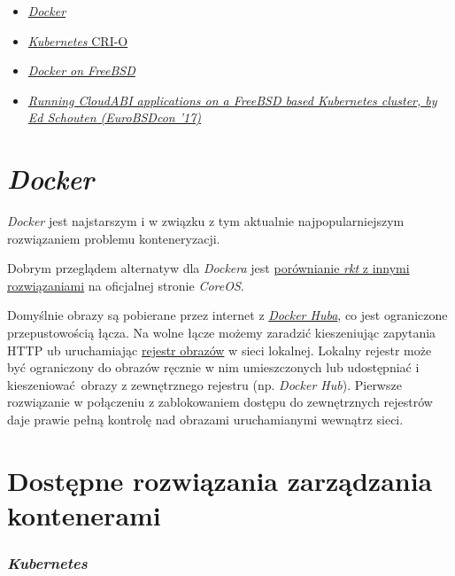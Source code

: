 \documentclass[a4paper,12pt,twoside,openany]{report}
\providecommand{\tightlist}{%
  \setlength{\itemsep}{0pt}\setlength{\parskip}{0pt}}
\begin{document}
\begin{itemize}
\tightlist
\item
  \href{https://blog.docker.com/2017/07/demystifying-open-container-initiative-oci-specifications/}{\emph{Docker}}
\item
  \href{https://github.com/kubernetes-incubator/cri-o}{\emph{Kubernetes}
  CRI-O}
\item
  \href{https://wiki.freebsd.org/Docker}{\emph{Docker on FreeBSD}}
\item
  \href{https://www.youtube.com/watch?v=akLa9L5O0NY}{\emph{Running
  CloudABI applications on a FreeBSD based Kubernetes cluster, by Ed
  Schouten (EuroBSDcon '17)}}
\end{itemize}

\hypertarget{docker}{%
\section{\texorpdfstring{\emph{Docker}}{Docker}}\label{docker}}

\emph{Docker} jest najstarszym i w związku z tym aktualnie
najpopularniejszym rozwiązaniem problemu konteneryzacji.

Dobrym przeglądem alternatyw dla \emph{Dockera} jest
\href{https://coreos.com/rkt/docs/latest/rkt-vs-other-projects.html}{porównianie
\emph{rkt} z innymi rozwiązaniami} na oficjalnej stronie \emph{CoreOS}.

Domyślnie obrazy są pobierane przez internet z
\href{https://hub.docker.com/}{\emph{Docker Huba}}, co jest ograniczone
przepustowością łącza. Na wolne łącze możemy zaradzić kieszeniując
zapytania HTTP ub uruchamiając
\href{https://docs.docker.com/registry/deploying/}{rejestr obrazów} w
sieci lokalnej. Lokalny rejestr może być ograniczony do obrazów ręcznie
w nim umieszczonych lub udostępniać i kieszeniować~obrazy z zewnętrznego
rejestru (np. \emph{Docker Hub}). Pierwsze rozwiązanie w połączeniu z
zablokowaniem dostępu do zewnętrznych rejestrów daje prawie pełną
kontrolę nad obrazami uruchamianymi wewnątrz sieci.

\hypertarget{dostux119pne-rozwiux105zania-zarzux105dzania-kontenerami}{%
\section{Dostępne rozwiązania zarządzania
kontenerami}\label{dostux119pne-rozwiux105zania-zarzux105dzania-kontenerami}}

\hypertarget{kubernetes}{%
\subsubsection{\texorpdfstring{\emph{Kubernetes}}{Kubernetes}}\label{kubernetes}}
\end{document}
